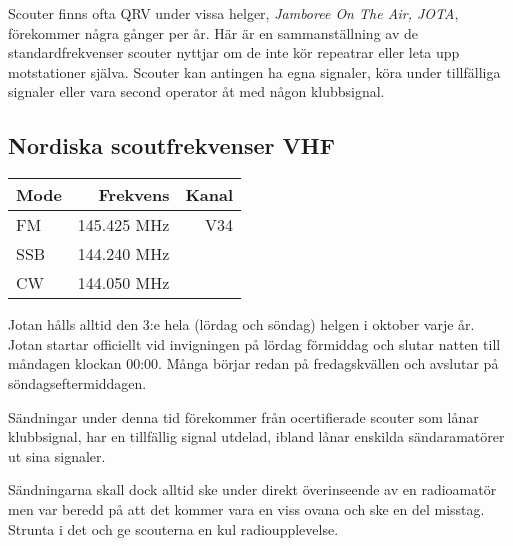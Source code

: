 Scouter finns ofta QRV under vissa helger, \textit{Jamboree On The
  Air, JOTA}, förekommer några gånger per år. Här är en
sammanställning av de standardfrekvenser scouter nyttjar om de inte
kör repeatrar eller leta upp motstationer själva. Scouter kan antingen
ha egna signaler, köra under tillfälliga signaler eller vara second
operator åt med någon klubbsignal.

\subsection{Nordiska scoutfrekvenser VHF}

\begin{center}
\begin{tabular}{lrr}
	\textbf{Mode} & \textbf{Frekvens} & \textbf{Kanal} \\ \hline
	FM            &      145.425  MHz &   V34 \\
	SSB           &      144.240  MHz &  \\
	CW            &      144.050  MHz &
\end{tabular}
\end{center}

Jotan hålls alltid den 3:e hela (lördag och söndag) helgen i oktober
varje år. Jotan startar officiellt vid invigningen på lördag förmiddag
och slutar natten till måndagen klockan 00:00. Många börjar redan på
fredagskvällen och avslutar på söndagseftermiddagen.

Sändningar under denna tid förekommer från ocertifierade scouter som
lånar klubbsignal, har en tillfällig signal utdelad, ibland lånar
enskilda sändaramatörer ut sina signaler.

Sändningarna skall dock alltid ske under direkt överinseende av en
radioamatör men var beredd på att det kommer vara en viss ovana och
ske en del misstag.  Strunta i det och ge scouterna en kul
radioupplevelse.






